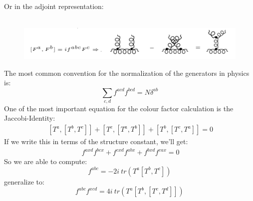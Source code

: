 Or in the adjoint representation:\\
\\
\begin{figure}[h!]
\centering
\includegraphics[scale=0.6]{images/Intro/CasimirAdj.png}
\end{figure}

The most common convention for the normalization of the generators in physics is:
\begin{equation}
\displaystyle\sum\limits_{c,d} f^{acd} f^{bcd} = N \delta^{ab}
\end{equation}
One of the most important equation for the colour factor calculation is the Jaccobi-Identity:
\begin{equation}
\begin{split}\:
[T^a, [T^b , T^c]]+[T^c, [T^a , T^b]]+[T^b, [T^c , T^a]]=0
\end{split}
\end{equation}
If we write this in terms of the structure constant, we'll get:
\begin{equation}
\begin{split}\:
f^{axd} f^{bcx} +  f^{cxd} f^{abx} +f^{bxd} f^{cax} =0
\end{split}
\end{equation}
So we are able to compute:
\begin{equation}
f^{abc} = -2i\: tr(T^a[T^b, T^c])
\end{equation}
generalize to:
\begin{equation}
f^{abc}f^{xcd} = 4i\: tr(T^a[T^b, [T^c, T^d]])
\end{equation}

